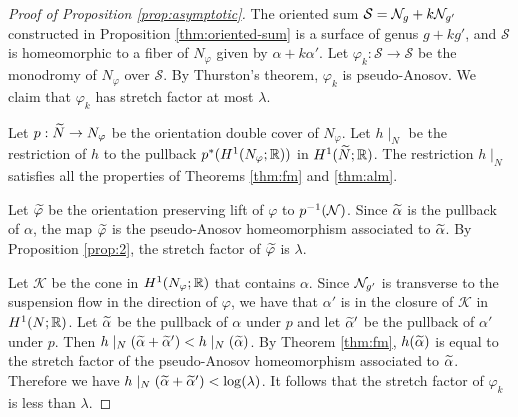 \begin{proof}[Proof of Proposition \ref{prop:asymptotic}]
The oriented sum $\mathcal{S}=\mathcal{N}_g+k\mathcal{N}_{g'}$ constructed in Proposition \ref{thm:oriented-sum} is a surface of genus $g+kg'$, and $\mathcal{S}$ is homeomorphic to a fiber of $N_\varphi$ given by $\alpha+k\alpha'$.  Let $\varphi_{k}:\mathcal{S}\rightarrow\mathcal{S}$ be the monodromy of $N_\varphi$ over $\mathcal{S}$.  By Thurston's theorem, $\varphi_k$ is pseudo-Anosov.  We claim that $\varphi_k$ has stretch factor at most $\lambda$.


Let $p:\widetilde{N}\rightarrow N_\varphi$ be the orientation double cover of $N_\varphi$. Let $h\mid_{N}$ be the restriction of $h$ to the pullback  $p^\ast(H^1(N_\varphi; \mathbb{R}))$ in $H^1(\widetilde{N}; \mathbb{R})$.
The restriction $h\mid_N$ satisfies all the properties of Theorems \ref{thm:fm} and \ref{thm:alm}.

 Let $\widetilde{\varphi}$ be the orientation preserving lift of $\varphi$ to $p^{-1}(\mathcal{N})$.  Since $\widetilde{\alpha}$ is the pullback of $\alpha$, the map $\widetilde{\varphi}$ is the pseudo-Anosov homeomorphism associated to $\widetilde{\alpha}$.  By Proposition \ref{prop:2}, the stretch factor of $\widetilde{\varphi}$ is $\lambda$.

Let $\mathcal{K}$ be the cone in $H^1(N_\varphi;\mathbb{R})$ that contains $\alpha$.  Since $\mathcal{N}_{g'}$ is transverse to the suspension flow in the direction of $\varphi$, we have that $\alpha'$ is in the closure of $\mathcal{K}$ in $H^1(N;\mathbb{R})$.  Let $\widetilde{\alpha}$ be the pullback of $\alpha$ under $p$ and let $\widetilde{\alpha}'$ be the pullback of $\alpha'$ under $p$.  Then $h\mid_N(\widetilde{\alpha}+\widetilde{\alpha}')<h\mid_N(\widetilde{\alpha})$.  By Theorem \ref{thm:fm}, $h(\widetilde{\alpha})$ is equal to the stretch factor of the pseudo-Anosov homeomorphism associated to $\widetilde{\alpha}$.  Therefore we have $h\mid_N(\widetilde{\alpha}+\widetilde{\alpha}')<\log(\lambda)$. It follows that the stretch factor of $\varphi_k$ is less than $\lambda$.
\end{proof}

